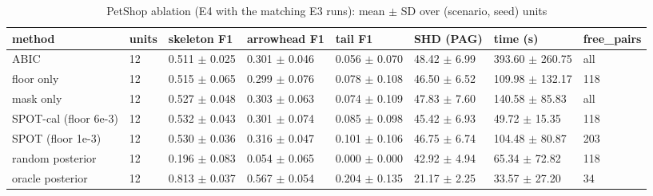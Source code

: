 \begin{table}[t]
\centering\footnotesize
\caption{PetShop ablation (E4 with the matching E3 runs): mean $\pm$ SD over (scenario, seed) units}\label{tab:T3_ablation}
\begin{tabular}{@{}llllllll@{}}
\toprule
method & units & skeleton F1 & arrowhead F1 & tail F1 & SHD (PAG) & time (s) & free\_pairs\\
\midrule
ABIC & 12 & 0.511 $\pm$ 0.025 & 0.301 $\pm$ 0.046 & 0.056 $\pm$ 0.070 & 48.42 $\pm$ 6.99 & 393.60 $\pm$ 260.75 & all\\
floor only & 12 & 0.515 $\pm$ 0.065 & 0.299 $\pm$ 0.076 & 0.078 $\pm$ 0.108 & 46.50 $\pm$ 6.52 & 109.98 $\pm$ 132.17 & 118\\
mask only & 12 & 0.527 $\pm$ 0.048 & 0.303 $\pm$ 0.063 & 0.074 $\pm$ 0.109 & 47.83 $\pm$ 7.60 & 140.58 $\pm$ 85.83 & all\\
SPOT-cal (floor 6e-3) & 12 & 0.532 $\pm$ 0.043 & 0.301 $\pm$ 0.074 & 0.085 $\pm$ 0.098 & 45.42 $\pm$ 6.93 & 49.72 $\pm$ 15.35 & 118\\
SPOT (floor 1e-3) & 12 & 0.530 $\pm$ 0.036 & 0.316 $\pm$ 0.047 & 0.101 $\pm$ 0.106 & 46.75 $\pm$ 6.74 & 104.48 $\pm$ 80.87 & 203\\
random posterior & 12 & 0.196 $\pm$ 0.083 & 0.054 $\pm$ 0.065 & 0.000 $\pm$ 0.000 & 42.92 $\pm$ 4.94 & 65.34 $\pm$ 72.82 & 118\\
oracle posterior & 12 & 0.813 $\pm$ 0.037 & 0.567 $\pm$ 0.054 & 0.204 $\pm$ 0.135 & 21.17 $\pm$ 2.25 & 33.57 $\pm$ 27.20 & 34\\
\bottomrule
\end{tabular}
\end{table}
